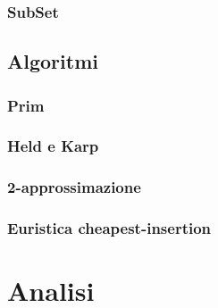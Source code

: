 \documentclass[]{article}
\begin{document}
\subsubsection{SubSet}

\subsection{Algoritmi}
\subsubsection{Prim}
\subsubsection{Held e Karp}
\subsubsection{2-approssimazione}
\subsubsection{Euristica cheapest-insertion}

\section{Analisi}

\end{document}
